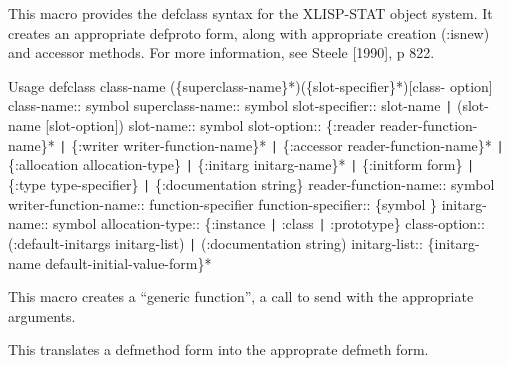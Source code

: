 \endDefinition

\beginProjectFuns

\beginDefinition


\beginDocumentation
This macro provides the defclass syntax for the XLISP-STAT object
system.  It creates an appropriate defproto form, along with
appropriate creation (:isnew) and accessor methods.  For more
information, see Steele [1990], p 822.

    Usage
    defclass class-name (\{superclass-name\}*)(\{slot-specifier\}*)[class-
      option]
    class-name:: symbol
    superclass-name:: symbol
    slot-specifier:: slot-name {\tt|} (slot-name [slot-option])
    slot-name:: symbol
    slot-option::
     \{:reader reader-function-name\}* {\tt|}
     \{:writer writer-function-name\}* {\tt|}
     \{:accessor reader-function-name\}* {\tt|}
     \{:allocation allocation-type\} {\tt|}
     \{:initarg initarg-name\}* {\tt|}
     \{:initform form\} {\tt|}
     \{:type type-specifier\} {\tt|}
     \{:documentation string\}
    reader-function-name:: symbol
    writer-function-name:: function-specifier
    function-specifier:: \{symbol \}
    initarg-name:: symbol
    allocation-type:: \{:instance {\tt|} :class {\tt|} :prototype\}
    class-option::
     (:default-initargs initarg-list) {\tt|}
     (:documentation string) 
    initarg-list:: \{initarg-name default-initial-value-form\}*
\endDocumentation
{}\endUsage

\endDefinition


\beginDefinition


\beginDocumentation
This macro creates a ``generic function'', a call to send with the
appropriate arguments.\endDocumentation
{}\endUsage

\endDefinition


\beginDefinition


\beginDocumentation
This translates a defmethod form into the approprate defmeth form.\endDocumentation
{}\endUsage

\endDefinition


